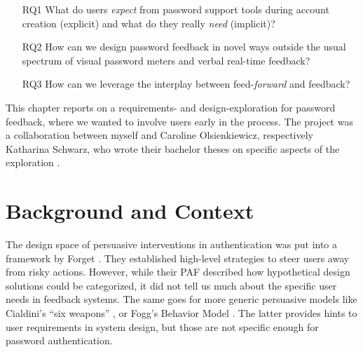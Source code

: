\begin{itemize}
	\item[RQ1] What do users \textit{expect} from password support tools during account creation (explicit) and what do they really \textit{need} (implicit)?
	\item[RQ2] How can we design password feedback in novel ways outside the usual spectrum of visual password meters and verbal real-time feedback? %
	\item[RQ3] How can we leverage the interplay between feed-\textit{forward} and feedback?
\end{itemize}


This chapter reports on a requirements- and design-exploration for password feedback, where we wanted to involve users early in the process. The project was a collaboration between myself and Caroline Olsienkiewicz, respectively Katharina Schwarz, who wrote their bachelor theses on specific aspects of the exploration \cite{Olsienkiewicz2016BAThesis, Schwarz2016BAThesis}.

\section{Background and Context}

The design space of persuasive interventions in authentication was put into a framework by Forget \etal \cite{Forget2007PersuasionEducationSecurity}. They established high-level strategies to steer users away from risky actions. However, while their \acrlong{PAF} described how hypothetical design solutions could be categorized, it did not tell us much about the specific user needs in feedback systems. The same goes for more generic persuasive models like Cialdini's ``six weapons'' \cite{Cialdini2007Influence}, or Fogg's Behavior Model \cite{Fogg2009BehavioralModel}. The latter provides hints to user requirements in system design, but those are not specific enough for password authentication.

